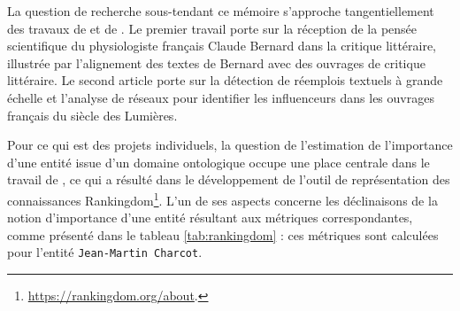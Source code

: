 
La question de recherche sous-tendant ce mémoire s'approche tangentiellement des travaux de \citet{riguet2018impact} et de \citet{roe2023enlightenment}. Le premier travail porte sur la réception de la pensée scientifique du physiologiste français Claude Bernard dans la critique littéraire, illustrée par l'alignement des textes de Bernard avec des ouvrages de critique littéraire. Le second article porte sur la détection de réemplois textuels à grande échelle et l'analyse de réseaux pour identifier les \og{}influenceurs\fg{} dans les ouvrages français du siècle des Lumières.

Pour ce qui est des projets individuels, la question de l'estimation de l'importance d'une entité issue d'un domaine ontologique occupe une place centrale dans le travail de \citet{soulet2024}, ce qui a résulté dans le développement de l'outil de représentation des connaissances Rankingdom\footnote{\url{https://rankingdom.org/about}.}. L'un de ses aspects concerne les déclinaisons de la notion d'importance d'une entité résultant aux métriques correspondantes, comme présenté dans le tableau \ref{tab:rankingdom} : ces métriques sont calculées pour l'entité \texttt{Jean-Martin Charcot}.


